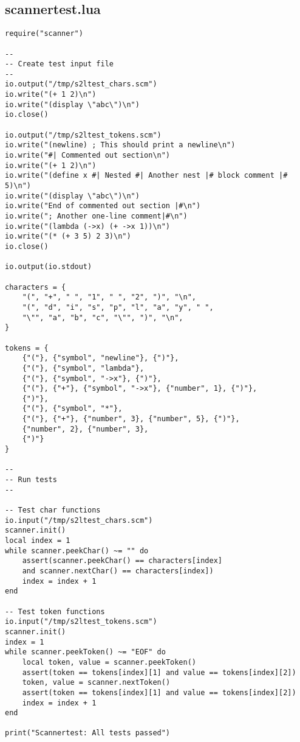\subsection{scannertest.lua}
\begin{verbatim}
require("scanner")

--
-- Create test input file
--
io.output("/tmp/s2ltest_chars.scm")
io.write("(+ 1 2)\n")
io.write("(display \"abc\")\n")
io.close()

io.output("/tmp/s2ltest_tokens.scm")
io.write("(newline) ; This should print a newline\n")
io.write("#| Commented out section\n")
io.write("(+ 1 2)\n")
io.write("(define x #| Nested #| Another nest |# block comment |# 5)\n")
io.write("(display \"abc\")\n")
io.write("End of commented out section |#\n")
io.write("; Another one-line comment|#\n")
io.write("(lambda (->x) (+ ->x 1))\n")
io.write("(* (+ 3 5) 2 3)\n")
io.close()

io.output(io.stdout)

characters = {
    "(", "+", " ", "1", " ", "2", ")", "\n",
    "(", "d", "i", "s", "p", "l", "a", "y", " ",
    "\"", "a", "b", "c", "\"", ")", "\n", 
}

tokens = {
    {"("}, {"symbol", "newline"}, {")"},
    {"("}, {"symbol", "lambda"},
	{"("}, {"symbol", "->x"}, {")"},
	{"("}, {"+"}, {"symbol", "->x"}, {"number", 1}, {")"},
    {")"},
    {"("}, {"symbol", "*"},
	{"("}, {"+"}, {"number", 3}, {"number", 5}, {")"},
	{"number", 2}, {"number", 3},
    {")"}
}

--
-- Run tests
--

-- Test char functions
io.input("/tmp/s2ltest_chars.scm")
scanner.init()
local index = 1
while scanner.peekChar() ~= "" do
    assert(scanner.peekChar() == characters[index]
    and scanner.nextChar() == characters[index])
    index = index + 1
end

-- Test token functions
io.input("/tmp/s2ltest_tokens.scm")
scanner.init()
index = 1
while scanner.peekToken() ~= "EOF" do
    local token, value = scanner.peekToken()
    assert(token == tokens[index][1] and value == tokens[index][2])
    token, value = scanner.nextToken()
    assert(token == tokens[index][1] and value == tokens[index][2])
    index = index + 1
end

print("Scannertest: All tests passed")
\end{verbatim}

